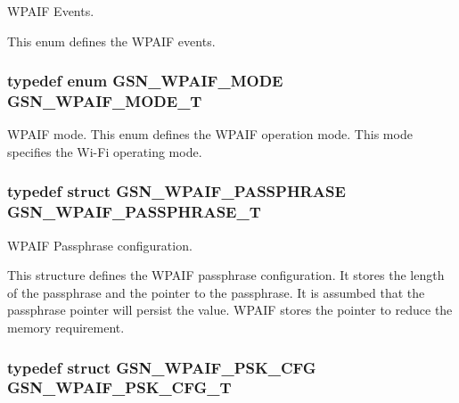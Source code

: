 WPAIF Events. 

This enum defines the WPAIF events. \hypertarget{a00687_gafdd00105be3584713f485995fb16fc07}{
\subsubsection[{GSN\_\-WPAIF\_\-MODE\_\-T}]{\setlength{\rightskip}{0pt plus 5cm}typedef enum {\bf GSN\_\-WPAIF\_\-MODE} {\bf GSN\_\-WPAIF\_\-MODE\_\-T}}}
\label{a00687_gafdd00105be3584713f485995fb16fc07}


WPAIF mode. This enum defines the WPAIF operation mode. This mode specifies the Wi-\/Fi operating mode. 

\hypertarget{a00687_ga3cab0646203b96a6bc26d38587ecba02}{
\subsubsection[{GSN\_\-WPAIF\_\-PASSPHRASE\_\-T}]{\setlength{\rightskip}{0pt plus 5cm}typedef struct {\bf GSN\_\-WPAIF\_\-PASSPHRASE} {\bf GSN\_\-WPAIF\_\-PASSPHRASE\_\-T}}}
\label{a00687_ga3cab0646203b96a6bc26d38587ecba02}


WPAIF Passphrase configuration. 

This structure defines the WPAIF passphrase configuration. It stores the length of the passphrase and the pointer to the passphrase. It is assumbed that the passphrase pointer will persist the value. WPAIF stores the pointer to reduce the memory requirement. \hypertarget{a00687_ga76d386ef77db02abc848f5e9a50cd8e5}{
\subsubsection[{GSN\_\-WPAIF\_\-PSK\_\-CFG\_\-T}]{\setlength{\rightskip}{0pt plus 5cm}typedef struct {\bf GSN\_\-WPAIF\_\-PSK\_\-CFG} {\bf GSN\_\-WPAIF\_\-PSK\_\-CFG\_\-T}}}
\label{a00687_ga76d386ef77db02abc848f5e9a50cd8e5}


